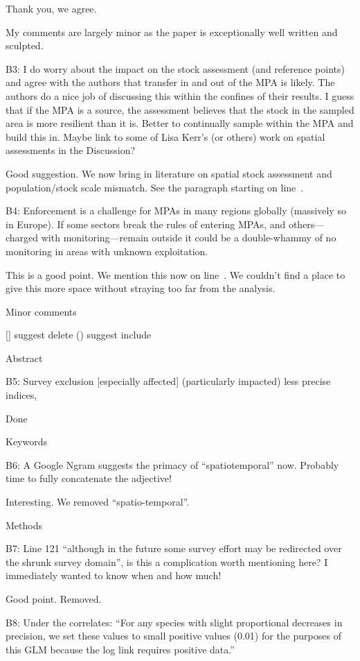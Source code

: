 \documentclass[12pt]{article}
\newcommand{\rev}[1]{{\color{niceblue} #1}}
\newcommand{\lr}[1]{line~\lineref{#1}}
\begin{document}
Thank you, we agree.

\rev{My comments are largely minor as the paper is exceptionally well written and sculpted.}

\rev{B3: I do worry about the impact on the stock assessment (and reference points) and agree with the authors that transfer in and out of the MPA is likely. The authors do a nice job of discussing this within the confines of their results. I guess that if the MPA is a source, the assessment believes that the stock in the sampled area is more resilient than it is. Better to continually sample within the MPA and build this in. Maybe link to some of Lisa Kerr’s (or others) work on spatial assessments in the Discussion?}

Good suggestion. We now bring in literature on spatial stock assessment and population/stock scale mismatch. See the paragraph starting on \lr{B3}.

\rev{B4: Enforcement is a challenge for MPAs in many regions globally (massively so in Europe). If some sectors break the rules of entering MPAs, and others---charged with monitoring---remain outside it could be a double-whammy of no monitoring in areas with unknown exploitation.}

This is a good point. We mention this now on \lr{B4}. We couldn't find a place to give this more space without straying too far from the analysis.

\rev{Minor comments}

\rev{[] suggest delete () suggest include}

\rev{Abstract}

\rev{B5: Survey exclusion [especially affected] (particularly impacted) less precise indices,}

Done

\rev{Keywords}

\rev{B6: A Google Ngram suggests the primacy of “spatiotemporal” now. Probably time to
fully concatenate the adjective!}

Interesting. We removed ``spatio-temporal''.

\rev{Methods}

\rev{B7: Line 121 “although in the future some survey effort may be redirected over the
shrunk survey domain”, is this a complication worth mentioning here?
I immediately wanted to know when and how much!}

Good point. Removed.

\rev{B8: Under the correlates: “For any species with slight proportional decreases in precision, we set these values to small positive values (0.01) for the purposes of this GLM because the log link requires positive data.”}
\end{document}
